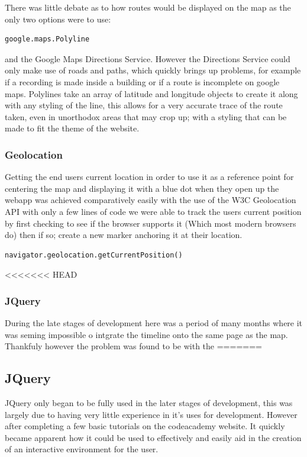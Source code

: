 \documentclass{l3proj}
\begin{document}
There was little debate as to how routes would be displayed on the map
as the only two options were to use:
\begin{verbatim}
google.maps.Polyline
\end{verbatim}
and the Google Maps Directions Service. However the Directions Service
could only make use of roads and paths, which quickly brings up
problems, for example if a recording is made inside a building or if a
route is incomplete on google maps. Polylines take an array of
latitude and longitude objects to create it along with any styling of
the line, this allows for a very accurate trace of the route taken,
even in unorthodox areas that may crop up; with a styling that can be
made to fit the theme of the website.

\subsubsection{Geolocation}

Getting the end users current location in order to use it as a
reference point for centering the map and displaying it with a blue
dot when they open up the webapp was achieved comparatively easily
with the use of the W3C Geolocation API with only a few lines of code
we were able to track the users current position by first checking to
see if the browser supports it (Which most modern browsers do) then if
so; create a new marker anchoring it at their location.
\begin{verbatim}
navigator.geolocation.getCurrentPosition()
\end{verbatim}

<<<<<<< HEAD
\subsubsection{JQuery}

During the late stages of development here was a period of many months
where it was seming impossible o intgrate the timeline onto the same
page as the map. Thankfuly however the problem was found to be with the
=======
\subsection{JQuery}
JQuery only began to be fully used in the later stages of development, 
this was largely due to having very little experience in it's uses
for development. However after completing a few basic tutorials on the 
codeacademy website. It quickly became apparent how it could be used 
to effectively and easily aid in the creation of an interactive 
environment for the user.
\end{document}
